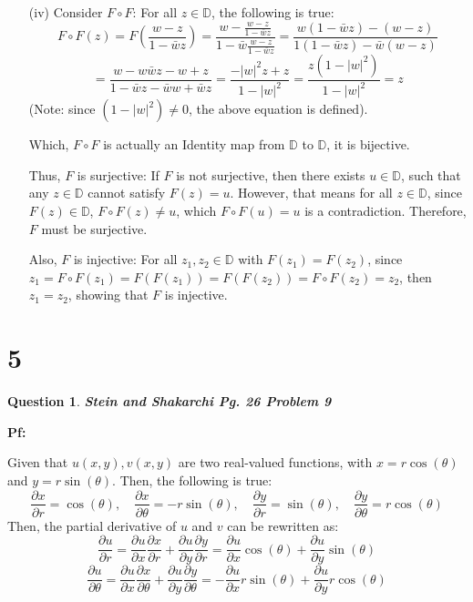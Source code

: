 \documentclass{article}
\newtheorem{question}{Question}
\begin{document}
\begin{itemize}
\begin{itemize}
        \hfill

        \item[(iv)]
        Consider $F\circ F$: For all $z\in\mathbb{D}$, the following is true:
        $$F\circ F(z) = F\left(\frac{w-z}{1-\bar{w}z}\right) = \frac{w-\frac{w-z}{1-\bar{w}z}}{1-\bar{w}\frac{w-z}{1-\bar{w}z}} = \frac{w(1-\bar{w}z)-(w-z)}{1(1-\bar{w}z)-\bar{w}(w-z)}$$
        $$=\frac{w-w\bar{w}z-w+z}{1-\bar{w}z-\bar{w}w+\bar{w}z} = \frac{-|w|^2z+z}{1-|w|^2} = \frac{z(1-|w|^2)}{1-|w|^2} = z$$
        (Note: since $(1-|w|^2)\neq 0$, the above equation is defined).

        Which, $F\circ F$ is actually an Identity map from $\mathbb{D}$ to $\mathbb{D}$, it is bijective.

        Thus, $F$ is surjective: If $F$ is not surjective, then there exists $u\in\mathbb{D}$, such that any $z\in\mathbb{D}$ cannot satisfy $F(z)=u$. However, that means for all $z\in \mathbb{D}$, since $F(z)\in\mathbb{D}$, $F\circ F(z) \neq u$, which $F\circ F(u) = u$ is a contradiction. Therefore, $F$ must be surjective.

        Also, $F$ is injective: For all $z_1,z_2\in\mathbb{D}$ with $F(z_1)=F(z_2)$, since $z_1=F\circ F(z_1)=F(F(z_1)) = F(F(z_2)) = F\circ F(z_2) = z_2$, then $z_1=z_2$, showing that $F$ is injective.
    \end{itemize}
\end{itemize}

\break

\section*{5}
\begin{question}
    \textbf{Stein and Shakarchi Pg. 26 Problem 9
    }
\end{question}

\textbf{Pf:}

Given that $u(x,y), v(x,y)$ are two real-valued functions, with $x=r\cos(\theta)$ and $y=r\sin(\theta)$. Then, the following is true:
$$\frac{\partial x}{\partial r}=\cos(\theta),\quad \frac{\partial x}{\partial \theta} = -r\sin(\theta),\quad \frac{\partial y}{\partial r}=\sin(\theta),\quad \frac{\partial y}{\partial \theta} = r\cos(\theta)$$
Then, the partial derivative of $u$ and $v$ can be rewritten as:
$$\frac{\partial u}{\partial r} = \frac{\partial u}{\partial x}\frac{\partial x}{\partial r}+\frac{\partial u}{\partial y}\frac{\partial y}{\partial r} = \frac{\partial u}{\partial x}\cos(\theta)+\frac{\partial u}{\partial y}\sin(\theta)$$
$$\frac{\partial u}{\partial \theta} = \frac{\partial u}{\partial x}\frac{\partial x}{\partial \theta}+\frac{\partial u}{\partial y}\frac{\partial y}{\partial \theta} = -\frac{\partial u}{\partial x}r\sin(\theta)+\frac{\partial u}{\partial y}r\cos(\theta)$$
\end{document}
